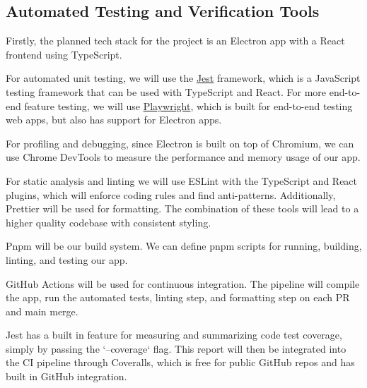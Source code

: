 \documentclass[12pt, titlepage]{article}
\begin{document}
\subsection{Automated Testing and Verification Tools}




Firstly, the planned tech stack for the project is an Electron app with a
React frontend using TypeScript.

For automated unit testing, we will use the \href{https://jestjs.io/}{Jest}
framework, which is a JavaScript testing framework that can be used with
TypeScript and React. For more end-to-end feature testing, we will use
\href{https://playwright.dev/}{Playwright}, which is built for end-to-end
testing web apps, but also has support for Electron apps.

For profiling and debugging, since Electron is built on top of Chromium, we can
use Chrome DevTools to measure the performance and memory usage of our app.

For static analysis and linting we will use ESLint with the TypeScript and
React plugins, which will enforce coding rules and find anti-patterns.
Additionally, Prettier will be used for formatting. The combination of these
tools will lead to a higher quality codebase with consistent styling.

Pnpm will be our build system. We can define pnpm scripts for running,
building, linting, and testing our app.

GitHub Actions will be used for continuous integration. The pipeline will
compile the app, run the automated tests, linting step, and formatting step on
each PR and main merge.

Jest has a built in feature for measuring and summarizing code test coverage,
simply by passing the `--coverage` flag. This report will then be integrated
into the CI pipeline through Coveralls, which is free for public GitHub repos
and has built in GitHub integration.
\end{document}
